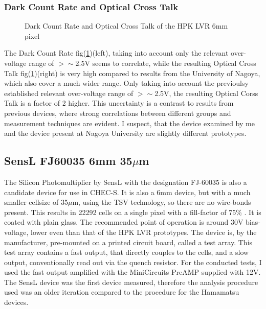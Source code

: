 \documentclass[12pt,article,type=msc,colorback,accentcolor=tud9c]{tudthesis}
\begin{document}
\subsubsection{Dark Count Rate and Optical Cross Talk}
\label{subsubsec:LVR6DCROCT}
\begin{figure}[h]
\begin{centering}
\caption{Dark Count Rate and Optical Cross Talk of the HPK LVR 6mm pixel}
\label{fig:LVR6_DCROCT}
\end{centering}
\end{figure}
The Dark Count Rate fig(\ref{fig:LVR6_DCROCT})(left), taking into account only the relevant over-voltage range of $>\sim$2.5V seems to correlate, while the resulting Optical Cross Talk fig(\ref{fig:LVR6_DCROCT})(right) is very high compared to results from the University of Nagoya, which also cover a much wider range. Only taking into account the previoulsy established relevant over-voltage range of $>\sim$2.5V, the resulting Optical Corss Talk is a factor of 2 higher. This uncertainty is a contrast to results from previous devices, where strong correlations between different groups and measurement techniques are evident. I suspect, that the device examined by me and the device present at Nagoya University are slightly different prototypes.




\clearpage
\subsection{SensL FJ60035 6mm 35$\mu$m}
The Silicon Photomultiplier by SensL with the designation FJ-60035 is also a candidate device for use in CHEC-S. It is also a 6mm device, but with a much smaller cellsize of 35$\mu$m, using the TSV technology, so there are no wire-bonds present. This results in 22292 cells on a single pixel with a fill-factor of 75\% . It is coated with plain glass. The recommended point of operation is around 30V bias-voltage, lower even than that of the HPK LVR prototypes. The device is, by the manufacturer, pre-mounted on a printed circuit board, called a test array. This test array contains a fast output, that directly couples to the cells, and a slow output, conventionally read out via the quench resistor. For the conducted tests, I used the fast output amplified with the MiniCircuits PreAMP supplied with 12V. The SensL device was the first device measured, therefore the analysis procedure used was an older iteration compared to the procedure for the Hamamatsu devices. 
\end{document}
